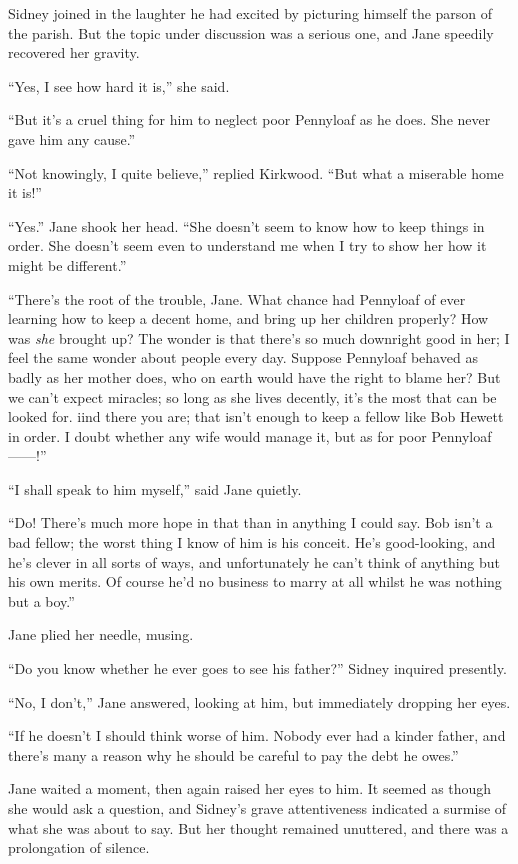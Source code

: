 Sidney joined in the laughter he had {}excited by picturing himself the
parson of the parish. But the topic under discussion was a serious one,
and Jane speedily recovered her gravity.

``Yes, I see how hard it is,'' she said.

``But it's a cruel thing for him to neglect poor Pennyloaf as he does.
She never gave him any cause.''

``Not knowingly, I quite believe,'' replied Kirkwood. ``But what a
miserable home it is!''

``Yes.'' Jane shook her head. ``She doesn't seem to know how to keep
things in order. She doesn't seem even to understand me when I try to
show her how it might be different.''

``There's the root of the trouble, Jane. What chance had Pennyloaf of
ever learning how to keep a decent home, and bring up her children
properly? How was \emph{she} brought up? The wonder is that there's so
much downright good in her; I feel the same wonder about people every
day. Suppose Pennyloaf behaved as badly as her mother {}does, who on
earth would have the right to blame her? But we can't expect miracles;
so long as she lives decently, it's the most that can be looked for.
iind there you are; that isn't enough to keep a fellow like Bob Hewett
in order. I doubt whether any wife would manage it, but as for poor
Pennyloaf{{------}}!''

``I shall speak to him myself,'' said Jane quietly.

``Do! There's much more hope in that than in anything I could say. Bob
isn't a bad fellow; the worst thing I know of him is his conceit. He's
good-looking, and he's clever in all sorts of ways, and unfortunately he
can't think of anything but his own merits. Of course he'd no business
to marry at all whilst he was nothing but a boy.''

Jane plied her needle, musing.

``Do you know whether he ever goes to see his father?'' Sidney inquired
presently.

``No, I don't,'' Jane answered, looking at him, but immediately dropping
her eyes.

``If he doesn't I should think worse of him. {}Nobody ever had a kinder
father, and there's many a reason why he should be careful to pay the
debt he owes.''

Jane waited a moment, then again raised her eyes to him. It seemed as
though she would ask a question, and Sidney's grave attentiveness
indicated a surmise of what she was about to say. But her thought
remained unuttered, and there was a prolongation of silence.

